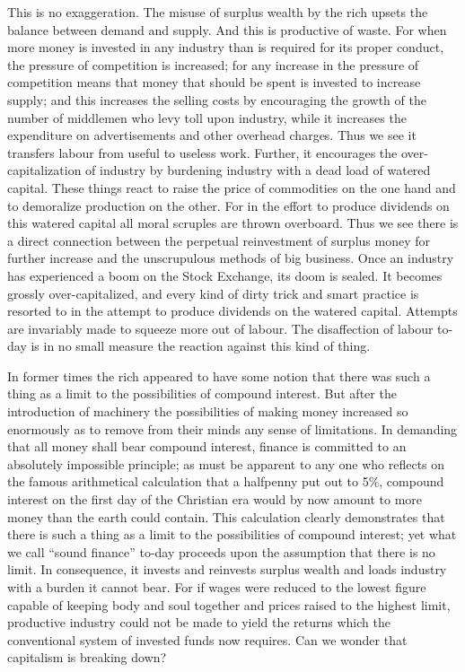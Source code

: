 \documentclass{book}
\begin{document}
This is no exaggeration. The misuse of surplus wealth by the rich upsets the balance between demand and supply. And this is productive of waste. For when more money is invested in any industry than is required for its proper conduct, the pressure of competition is increased; for any increase in the pressure of competition means that money that should be spent is invested to increase supply; and this increases the selling costs by encouraging the growth of the number of middlemen who levy toll upon industry, while it increases the expenditure on advertisements and other overhead charges. Thus we see it transfers labour from useful to useless work. Further, it encourages the over-capitalization of industry by burdening industry with a dead load of watered capital. These things react to raise the price of commodities on the one hand and to demoralize production on the other. For in the effort to produce dividends on this watered capital all moral scruples are thrown overboard. Thus we see there is a direct connection between the perpetual reinvestment of surplus money for further increase and the unscrupulous methods of big business. Once an industry has experienced a boom on the Stock Exchange, its doom is sealed. It becomes grossly over-capitalized, and every kind of dirty trick and smart practice is resorted to in the attempt to produce dividends on the watered capital. Attempts are invariably made to squeeze more out of labour. The disaffection of labour to-day is in no small measure the reaction against this kind of thing.

In former times the rich appeared to have some notion that there was such a thing as a limit to the possibilities of compound interest. But after the introduction of machinery the possibilities of making money increased so enormously as to remove from their minds any sense of limitations. In demanding that all money shall bear compound interest, finance is committed to an absolutely impossible principle; as must be apparent to any one who reflects on the famous arithmetical calculation that a halfpenny put out to 5\%, compound interest on the first day of the Christian era would by now amount to more money than the earth could contain. This calculation clearly demonstrates that there is such a thing as a limit to the possibilities of compound interest; yet what we call “sound finance” to-day proceeds upon the assumption that there is no limit. In consequence, it invests and reinvests surplus wealth and loads industry with a burden it cannot bear. For if wages were reduced to the lowest figure capable of keeping body and soul together and prices raised to the highest limit, productive industry could not be made to yield the returns which the conventional system of invested funds now requires. Can we wonder that capitalism is breaking down?
\end{document}
